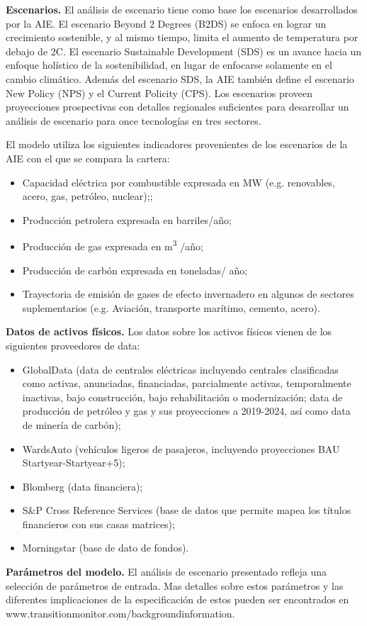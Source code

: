 \documentclass[10pt,table]{article}\usepackage[]{graphicx}\usepackage[]{color}
\begin{document}
\begin{multicols}{2}
		\textbf{Escenarios.} El análisis de escenario tiene como base los escenarios desarrollados por la AIE. El escenario Beyond 2 Degrees (B2DS) se enfoca en lograr un crecimiento sostenible, y al mismo tiempo, limita el aumento de temperatura por debajo de 2\degree C. El escenario Sustainable Development (SDS) es un avance hacia un enfoque holístico de la sostenibilidad, en lugar de enfocarse solamente en el cambio climático. Además del escenario SDS, la AIE también define el escenario New Policy (NPS) y el Current Policity (CPS). Los escenarios proveen proyecciones prospectivas con detalles regionales suficientes para desarrollar un análisis de escenario para once tecnologías en tres sectores.
		
			El modelo utiliza los siguientes indicadores provenientes de los escenarios de la AIE con el que se compara la cartera:
	
		\begin{itemize}
			\item{Capacidad eléctrica por combustible expresada en MW (e.g. renovables, acero, gas, petróleo, nuclear);;}
			\item{Producción petrolera expresada en barriles/año;}
			\item{Producción de gas expresada en m\textsuperscript{3} /año;}
			\item{Producción de carbón expresada en toneladas/ año;}
			\item{Trayectoria de emisión de gases de efecto invernadero en algunos de sectores suplementarios (e.g. Aviación, transporte marítimo, cemento, acero).}
		\end{itemize}
		
		 
		\textbf{Datos de activos físicos. } Los datos sobre los activos físicos vienen de los siguientes proveedores de data:
		\begin{itemize}
			\item{GlobalData (data de centrales eléctricas incluyendo centrales clasificadas como activas, anunciadas, financiadas, parcialmente activas, temporalmente inactivas, bajo construcción, bajo rehabilitación o modernización; data de producción de petróleo y gas y sus proyecciones a 2019-2024, así como data de minería de carbón); }
			\item{WardsAuto (vehículos ligeros de pasajeros, incluyendo proyecciones BAU Startyear-Startyear+5); }
			\item{Blomberg (data financiera);}
			\item{S\&P Cross Reference Services (base de datos que permite mapea los títulos financieros con sus casas matrices);}
			\item{Morningstar (base de dato de fondos). }
			
		\end{itemize}
		
		\textbf{Parámetros del modelo.} El análisis de escenario presentado refleja una selección de parámetros de entrada.  Mas detalles sobre estos parámetros y las diferentes implicaciones de la especificación de estos pueden ser encontrados en www.transitionmonitor.com/backgroundinformation.
		
		
		
	\end{multicols}
\end{document}

